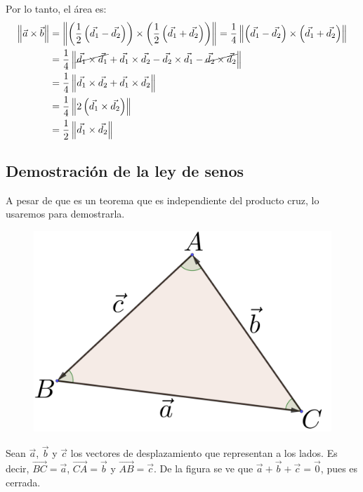 \documentclass[12pt, fleqn]{report}                             %
\theoremstyle{break}                                            %
\newcommand{\Wrap}[1]{\left( #1 \right)}                        %
\newcommand{\Abs}[1]{\left\lVert #1 \right\lVert}               %
\newcommand{\lVec}[1]{\overrightarrow{#1}}                      %
\begin{document}
            Por lo tanto, el área es:
            \begin{align*}
                \Abs{\vec{a} \times \vec{b}} &= \Abs{\Wrap{\dfrac{1}{2}\Wrap{\vec{d_1}-\vec{d_2}}} \times \Wrap{\dfrac{1}{2}\Wrap{\vec{d_1}+\vec{d_2}}}} = \dfrac{1}{4} \Abs{\Wrap{\vec{d_1}-\vec{d_2}} \times \Wrap{\vec{d_1}+\vec{d_2}}}\\
                &= \dfrac{1}{4}\Abs{\cancel{\vec{d_1} \times \vec{d_1}} + \vec{d_1} \times \vec{d_2} - \vec{d_2} \times \vec{d_1} - \cancel{\vec{d_2} \times \vec{d_2}}}\\
                &= \dfrac{1}{4}\Abs{\vec{d_1} \times \vec{d_2} + \vec{d_1} \times \vec{d_2}}\\
                &= \dfrac{1}{4}\Abs{2\Wrap{\vec{d_1} \times \vec{d_2}}}\\
                &= \dfrac{1}{2}\Abs{\vec{d_1} \times \vec{d_2}}
            \end{align*}
            
            \clearpage
            
            \subsection{Demostración de la ley de senos}
            A pesar de que es un teorema que es independiente del producto cruz, lo usaremos para demostrarla.
            
            \begin{figure}[H]
            	\centering
            	\includegraphics[scale=1.2]{sines.png}
            \end{figure}
            
            Sean $\vec{a}$, $\vec{b}$ y $\vec{c}$ los vectores de desplazamiento que representan a los lados. Es decir, $\lVec{BC}=\vec{a}$, $\lVec{CA}=\vec{b}$ y $\lVec{AB}=\vec{c}$. De la figura se ve que $\vec{a}+\vec{b}+\vec{c}=\vec{0}$, pues es cerrada.
            
\end{document}
